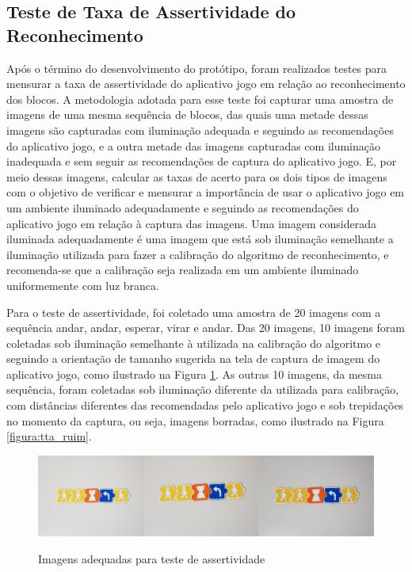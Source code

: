 \subsection{\textbf{Teste de Taxa de Assertividade do Reconhecimento}}

Após o término do desenvolvimento do protótipo, foram realizados testes para mensurar a taxa de assertividade do aplicativo jogo em relação ao reconhecimento dos blocos. A metodologia adotada para esse teste foi capturar uma amostra de imagens de uma mesma sequência de blocos, das quais uma metade dessas imagens são capturadas com iluminação adequada e seguindo as recomendações do aplicativo jogo, e a outra metade das imagens capturadas com iluminação inadequada e sem seguir as recomendações de captura do aplicativo jogo. E, por meio dessas imagens, calcular as taxas de acerto para os dois tipos de imagens com o objetivo de verificar e mensurar a importância de usar o aplicativo jogo em um ambiente iluminado adequadamente e seguindo as recomendações do aplicativo jogo em relação à captura das imagens. Uma imagem considerada iluminada adequadamente é uma imagem que está sob  iluminação semelhante a iluminação utilizada para fazer a calibração do algoritmo de reconhecimento, e recomenda-se que a calibração seja realizada em um ambiente iluminado uniformemente com luz branca. 

Para o teste de assertividade, foi coletado uma amostra de 20 imagens com a sequência andar, andar, esperar, virar e andar. Das 20 imagens, 10 imagens foram coletadas sob iluminação semelhante à utilizada na calibração do algoritmo e seguindo a orientação de tamanho sugerida na tela de captura de imagem do aplicativo jogo, como ilustrado na Figura \ref{figura:tta_boa}. As outras 10 imagens, da mesma sequência, foram coletadas sob iluminação diferente da utilizada para calibração, com distâncias diferentes das recomendadas pelo aplicativo jogo e sob trepidações no momento da captura, ou seja, imagens borradas, como ilustrado na Figura \ref{figura:tta_ruim}.

\begin{figure}[H]
    \caption{Imagens adequadas para teste de assertividade}
    \centering
    \includegraphics[width=15cm]{Imagens/Cap5/tta_boa.PNG}
    \label{figura:tta_boa}
\end{figure}

